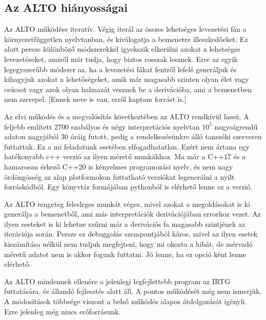 \subsection{Az ALTO hiányosságai}

Az ALTO működése iteratív. Végig iterál az összes lehetséges levezetési fán a környezetfüggetlen nyelvtanban, és kiválogatja a bemenetre illeszkedőeket. Ez alatt persze különböző módszerekkel igyekszik elkerülni azokat a lehetséges levezetéseket, amiről már tudja, hogy biztos rosszak lesznek. Erre az egyik legegyszerűbb módszer az, ha a levezetési fákat fentről lefelé generáljuk és kihagyjuk azokat a lehetőségeket, amik már magasabb szinten olyan élet vagy csúcsot vagy azok olyan halmazát vesznek be a derivációba, ami a bemenetben nem szerepel. [Ennek neve is van, erről kaptam forrást is.]

Az elvi működés és a megvalósítás következtében az ALTO rendkívül lassú. A feljebb említett 2700 szabályos és négy interpretációs nyelvtan $10^5$ nagyságrendű adaton nagyjából 30 óráig futott, pedig a rendelkezésünkre álló tanszéki szerveren futtattuk. Ez a mi feladatunk esetében elfogadhatatlan. Ezért nem ártana egy hatékonyabb c++ verzió az ilyen méretű munkákhoz. Ma már a C++17 és a hamarosan érkező C++20 is kényelmes programozási nyelv, és nem nagy ördöngösség az alap platformokon futtatható verziókat legenerálni a nyílt forráskódból. Egy könyvtár formájában pythonból is elérhető lenne ez a verzió.

Az ALTO rengeteg felesleges munkát végez, mivel azokat a megoldásokat is ki generálja a bemenetből, ami más interpretációk derivációjában errorhoz vezet. Az ilyen eseteket is ki lehetne szűrni már a derivációs fa magasabb szintjének az iterációja során. Persze ez debuggolás szempontjából káros, mivel az ilyen esetek kiszámítása nélkül nem tudjuk megfejteni, hogy mi okozta a hibát, de mérvadó méretű adatot nem is akkor fogunk futtatni. Jó lenne, ha ez opció ként lenne elérhető.

Az ALTO mindennek ellenére a jelenlegi legfejlettebb program az IRTG futtatására, és állandó fejlesztés alatt áll. A pontos működését még nem ismerjük. A módosítások többsége viszont a belső működés alapos átdolgozását igényli. Erre jelenleg még nincs erőforrásunk.


